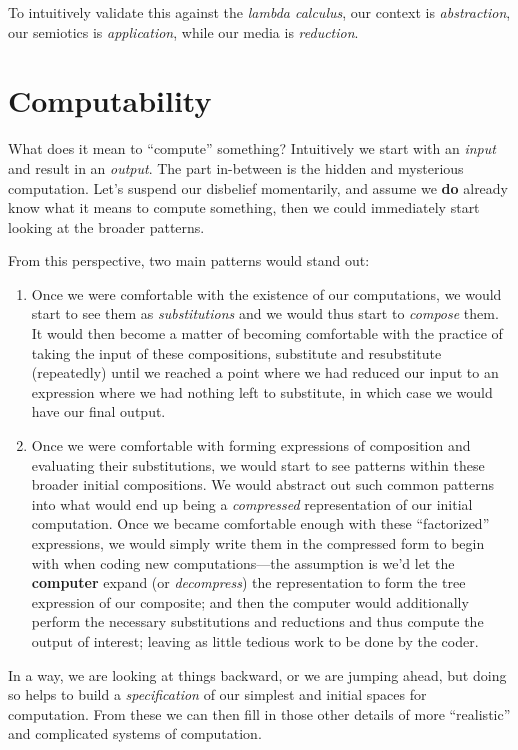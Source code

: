\documentclass[twoside]{article}
\begin{document}
To intuitively validate this against the \emph{lambda calculus}, our context is \emph{abstraction}, our semiotics is \emph{application},
while our media is \emph{reduction}.

\section*{Computability}

What does it mean to ``compute'' something? Intuitively we start with an \emph{input} and result in an \emph{output}. The part
in-between is the hidden and mysterious computation. Let's suspend our disbelief momentarily, and assume we {\bfseries do} already
know what it means to compute something, then we could immediately start looking at the broader patterns.

From this perspective, two main patterns would stand out:

\begin{enumerate}
\item	Once we were comfortable with the existence of our computations, we would start to see them as \emph{substitutions} and we
	would thus start to \emph{compose} them. It would then become a matter of becoming comfortable with the practice of taking
	the input of these compositions, substitute and resubstitute (repeatedly) until we reached a point where we had reduced our
	input to an expression where we had nothing left to substitute, in which case we would have our final output.
\item	Once we were comfortable with forming expressions of composition and evaluating their substitutions, we would start to see
	patterns within these broader initial compositions.  We would abstract out such common patterns into what would end up being
	a \emph{compressed} representation of our initial computation.  Once we became comfortable enough with these ``factorized''
	expressions, we would simply write them in the compressed form to begin with when coding new computations---the assumption
	is we'd let the {\bfseries computer} expand (or \emph{decompress}) the representation to form the tree expression of our
	composite; and then the computer would additionally perform the necessary substitutions and reductions and thus compute
	the output of interest; leaving as little tedious work to be done by the coder.
\end{enumerate}

In a way, we are looking at things backward, or we are jumping ahead, but doing so helps to build a \emph{specification} of our
simplest and initial spaces for computation. From these we can then fill in those other details of more ``realistic'' and
complicated systems of computation.
\end{document}
